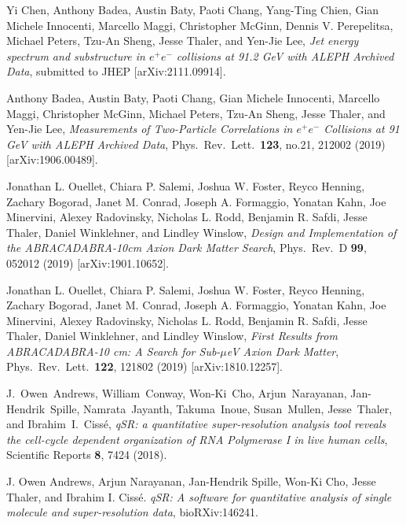 \documentclass[11pt]{article}
\renewcommand{\bibitem}[1]{\item}
\begin{document}
\begin{list}{[A]\addtocounter{jessecount}{-1}}{\leftmargin=3em \itemsep=4pt}

\bibitem{Chen:2021uws}
Yi Chen, Anthony Badea, Austin Baty, Paoti Chang, Yang-Ting Chien, Gian Michele Innocenti, Marcello Maggi, Christopher McGinn, Dennis V. Perepelitsa, Michael Peters, Tzu-An Sheng, Jesse Thaler, and Yen-Jie Lee,
\emph{Jet energy spectrum and substructure in $e^+e^-$ collisions at 91.2 GeV with ALEPH Archived Data},
submitted to JHEP
[arXiv:2111.09914].

\bibitem{Badea:2019vey} 
Anthony Badea, Austin Baty, Paoti Chang, Gian Michele Innocenti, Marcello Maggi, Christopher McGinn, Michael Peters, Tzu-An Sheng, Jesse Thaler, and Yen-Jie Lee,
  \emph{Measurements of Two-Particle Correlations in $e^+e^-$ Collisions at 91 GeV with ALEPH Archived Data},
Phys.\ Rev.\ Lett.\ \textbf{123}, no.21, 212002 (2019)
[arXiv:1906.00489].

\bibitem{Ouellet:2019tlz} 
Jonathan L. Ouellet, Chiara P. Salemi, Joshua W. Foster, Reyco Henning, Zachary Bogorad, Janet M. Conrad, Joseph A. Formaggio, Yonatan Kahn, Joe Minervini, Alexey Radovinsky, Nicholas L. Rodd, Benjamin R. Safdi, Jesse Thaler, Daniel Winklehner, and Lindley Winslow,
  \emph{Design and Implementation of the ABRACADABRA-10cm Axion Dark Matter Search},
  Phys.\ Rev.\ D {\bf 99}, 052012 (2019)
  [arXiv:1901.10652].


\bibitem{Ouellet:2018beu} 
Jonathan L. Ouellet, Chiara P. Salemi, Joshua W. Foster, Reyco Henning, Zachary Bogorad, Janet M. Conrad, Joseph A. Formaggio, Yonatan Kahn, Joe Minervini, Alexey Radovinsky, Nicholas L. Rodd, Benjamin R. Safdi, Jesse Thaler, Daniel Winklehner, and Lindley Winslow, 
  \emph{First Results from ABRACADABRA-10 cm: A Search for Sub-$\mu$eV Axion Dark Matter},
  Phys.\ Rev.\ Lett.\  {\bf 122}, 121802 (2019)
  [arXiv:1810.12257].

\bibitem{qSR}
J.~Owen~Andrews, William~Conway, Won-Ki~Cho, Arjun~Narayanan, Jan-Hendrik~Spille, Namrata~Jayanth, Takuma~Inoue, Susan~Mullen, Jesse~Thaler, and Ibrahim~I.~Ciss\'e, 
\emph{qSR: a quantitative super-resolution analysis tool reveals the cell-cycle dependent organization of RNA Polymerase I in live human cells},
Scientific Reports {\bf 8}, 7424 (2018).

\bibitem{qSRpre}
J. Owen Andrews, Arjun Narayanan, Jan-Hendrik Spille, Won-Ki Cho, Jesse Thaler, and Ibrahim I. Ciss\'e.
\emph{qSR: A software for quantitative analysis of single molecule and super-resolution data},
bioRXiv:146241.

\end{list}
\end{document}
